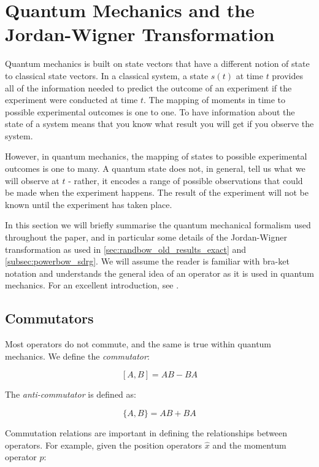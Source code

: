 
\section{Quantum Mechanics and the Jordan-Wigner Transformation}\label{sec:quantum}
Quantum mechanics is built on state vectors that have a different notion of state to classical state vectors. In a classical system, a state $s(t)$ at time $t$ provides all of the information needed to predict the outcome of an experiment if the experiment were conducted at time $t$. The mapping of moments in time to possible experimental outcomes is one to one. To have information about the state of a system means that you know what result you will get if you observe the system.

However, in quantum mechanics, the mapping of states to possible experimental outcomes is one to many. A quantum state does not, in general, tell us what we will observe at $t$ - rather, it encodes a range of possible observations that could be made when the experiment happens. The result of the experiment will not be known until the experiment has taken place.

In this section we will briefly summarise the quantum mechanical formalism used throughout the paper, and in particular some details of the Jordan-Wigner transformation as used in \ref{sec:randbow_old_results_exact} and \ref{subsec:powerbow_sdrg}. We will assume the reader is familiar with bra-ket notation and understands the general idea of an operator as it is used in quantum mechanics. For an excellent introduction, see \cite{cresser}.


\subsection{Commutators}\label{subsec:commutators}
Most operators do not commute, and the same is true within quantum mechanics. We define the \textit{commutator}:

\begin{equation}\label{eq:commutator}
	[A, B] = AB - BA
\end{equation}

The \textit{anti-commutator} is defined as:

\begin{equation}\label{eq:anticommutator}
	\{A, B\} = AB + BA
\end{equation}

Commutation relations are important in defining the relationships between operators. For example, given the position operators $\hat{x}$ and the momentum operator $\hat{p}$:

